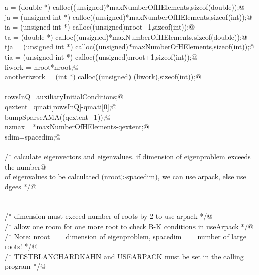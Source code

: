 \documentclass[12pt]{article}
\begin{document}
\begin{flushleft}
\begin{minipage}{\linewidth}
\begin{list}{}{}
\mbox{}\verb@                a = (double *) calloc((unsigned)*maxNumberOfHElements,sizeof(double));@\\
\mbox{}\verb@                ja = (unsigned int *) calloc((unsigned)*maxNumberOfHElements,sizeof(int));@\\
\mbox{}\verb@                ia = (unsigned int *) calloc((unsigned)nroot+1,sizeof(int));@\\
\mbox{}\verb@                ta = (double *) calloc((unsigned)*maxNumberOfHElements,sizeof(double));@\\
\mbox{}\verb@                tja = (unsigned int *) calloc((unsigned)*maxNumberOfHElements,sizeof(int));@\\
\mbox{}\verb@                tia = (unsigned int *) calloc((unsigned)nroot+1,sizeof(int));@\\
\mbox{}\verb@                liwork = nroot*nroot;@\\
\mbox{}\verb@                anotheriwork = (int *) calloc((unsigned) (liwork),sizeof(int));@\\
\mbox{}\verb@@\\
\mbox{}\verb@                rowsInQ=auxiliaryInitialConditions;@\\
\mbox{}\verb@                qextent=qmati[rowsInQ]-qmati[0];@\\
\mbox{}\verb@                bumpSparseAMA((qextent+1));@\\
\mbox{}\verb@                nzmax= *maxNumberOfHElements-qextent;@\\
\mbox{}\verb@                sdim=spacedim;@\\
\mbox{}\verb@@\\
\mbox{}\verb@                /* calculate eigenvectors and eigenvalues.  if dimension of eigenproblem exceeds the number@\\
\mbox{}\verb@                of eigenvalues to be calculated (nroot>spacedim), we can use arpack, else use dgees */@\\
\mbox{}\verb@@\\
\mbox{}\verb@@\\
\mbox{}\verb@                /* dimension must exceed number of roots by 2 to use arpack */@\\
\mbox{}\verb@                /* allow one room for one more root to check B-K conditions in useArpack */@\\
\mbox{}\verb@                /* Note:  nroot == dimension of eigenproblem, spacedim == number of large roots! */@\\
\mbox{}\verb@                /* TESTBLANCHARDKAHN and USEARPACK must be set in the calling program */@\\

\end{list}
\end{minipage}
\end{flushleft}
\end{document}
